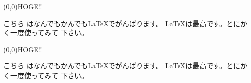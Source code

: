 ﻿\documentclass{jarticle}
\begin{document}
\boxput(0,0){\color{blue}\Huge HOGE!!}{%
  \color{red}\parbox{.5\linewidth}{こちら
はなんでもかんでも\LaTeX でがんばります。
\LaTeX は最高です。とにかく一度使ってみて
下さい。}} \par{}\cvs


\boxput*(0,0){\color{blue}\Huge HOGE!!}{%
  \color{red}\parbox{.5\linewidth}{こちら
はなんでもかんでも\LaTeX でがんばります。
\LaTeX は最高です。とにかく一度使ってみて
下さい。}} 
\end{document}
